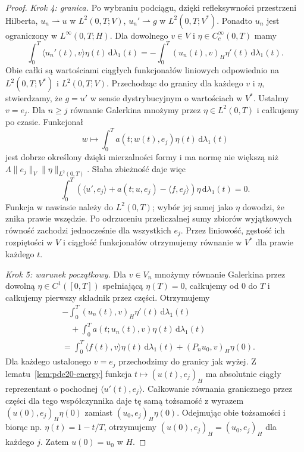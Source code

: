 \begin{proof}
\emph{Krok 4: granica.}
Po wybraniu podciągu, dzięki refleksywności przestrzeni Hilberta,
$u_n\rightharpoonup u$ w $L^2(0,T;V)$,
$u_n'\rightharpoonup g$ w $L^2(0,T;V^*)$.
Ponadto $u_n$ jest ograniczony w $L^\infty(0,T;H)$.
Dla dowolnego $v\in V$ i $\eta\in C_c^\infty(0,T)$ mamy
\[
 \int_0^T\langle u_n'(t),v\rangle\eta(t)\,\mathrm d\lambda_1(t)
 =-\int_0^T(u_n(t),v)_H\eta'(t)\,\mathrm d\lambda_1(t).
\]
Obie całki są wartościami ciągłych funkcjonałów
liniowych odpowiednio na $L^2(0,T;V^*)$ i $L^2(0,T;V)$.
Przechodząc do granicy dla każdego $v$ i $\eta$,
stwierdzamy, że $g=u'$ w sensie dystrybucyjnym
o wartościach w $V^*$.
Ustalmy $v=e_j$. Dla $n\ge j$ równanie Galerkina
mnożymy przez $\eta\in L^2(0,T)$ i całkujemy po czasie.
Funkcjonał
\[
 w\longmapsto\int_0^T a(t;w(t),e_j)\eta(t)
 \,\mathrm d\lambda_1(t)
\]
jest dobrze określony dzięki mierzalności formy
i ma normę nie większą niż
$\Lambda\|e_j\|_V\|\eta\|_{L^2(0,T)}$.
Słaba zbieżność daje więc
\[
 \int_0^T
 (\langle u',e_j\rangle+a(t;u,e_j)-\langle f,e_j\rangle)
 \eta\,\mathrm d\lambda_1(t)=0.
\]
Funkcja w nawiasie należy do $L^2(0,T)$; wybór jej
samej jako $\eta$ dowodzi, że znika prawie wszędzie.
Po odrzuceniu przeliczalnej sumy zbiorów wyjątkowych
równość zachodzi jednocześnie dla wszystkich $e_j$.
Przez liniowość, gęstość ich rozpiętości w $V$
i ciągłość funkcjonałów otrzymujemy równanie w $V^*$
dla prawie każdego $t$.

\emph{Krok 5: warunek początkowy.}
Dla $v\in V_n$ mnożymy równanie Galerkina przez
dowolną $\eta\in C^1([0,T])$ spełniającą $\eta(T)=0$,
całkujemy od $0$ do $T$ i całkujemy pierwszy składnik
przez części. Otrzymujemy
\[
 \begin{split}
 &-\int_0^T(u_n(t),v)_H\eta'(t)\,\mathrm d\lambda_1(t)\\
 &\quad+\int_0^T a(t;u_n(t),v)\eta(t)\,\mathrm d\lambda_1(t)\\
 &=\int_0^T\langle f(t),v\rangle\eta(t)\,\mathrm d\lambda_1(t)
 +(P_nu_0,v)_H\eta(0).
 \end{split}
\]
Dla każdego ustalonego $v=e_j$ przechodzimy do granicy jak wyżej.
Z lematu~\ref{lem:pde20-energy} funkcja
$t\mapsto(u(t),e_j)_H$ ma absolutnie ciągły reprezentant
o pochodnej $\langle u'(t),e_j\rangle$.
Całkowanie równania granicznego przez części
dla tego współczynnika daje tę samą tożsamość
z wyrazem $(u(0),e_j)_H\eta(0)$ zamiast
$(u_0,e_j)_H\eta(0)$.
Odejmując obie tożsamości i biorąc np.
$\eta(t)=1-t/T$, otrzymujemy
$(u(0),e_j)_H=(u_0,e_j)_H$ dla każdego $j$.
Zatem $u(0)=u_0$ w $H$.


\end{proof}
